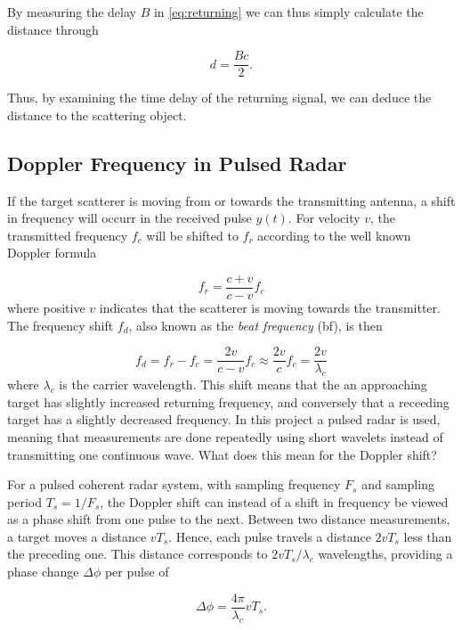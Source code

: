 By measuring the delay $B$ in \eqref{eq:returning} we can thus simply calculate the distance through

\begin{equation}
	d = \frac{Bc}{2}.
\end{equation}

Thus, by examining the time delay of the returning signal, we can deduce the distance to the scattering object. 

\subsection{Doppler Frequency in Pulsed Radar}\label{sec:doppler}
\label{doppler}

If the target scatterer is moving from or towards the transmitting antenna, a shift in frequency will occurr in the received pulse $y(t)$. For velocity $v$, the transmitted frequency $f_c$ will be shifted to $f_r$ according to the well known Doppler formula \citep{ridenour_1947}

\begin{equation}
	f_r = \frac{c + v}{c - v}f_c
\end{equation}
where positive $v$ indicates that the scatterer is moving towards the transmitter. The frequency shift $f_d$, also known as the \emph{beat frequency} (\gls{bf}), is then

\begin{equation}\label{eq:dshift}
	f_d 
	= f_r - f_c 
	= \frac{2v}{c-v}f_c \approx \frac{2v}{c}f_c 
	= \frac{2v}{\lambda_c}
\end{equation}
where $\lambda_c$ is the carrier wavelength. This shift means that the an approaching target has slightly increased returning frequency, and conversely that a receeding target has a slightly decreased frequency. In this project a pulsed radar is used, meaning that measurements are done repeatedly using short wavelets instead of transmitting one continuous wave. What does this mean for the Doppler shift?

For a pulsed coherent radar system, with sampling frequency $F_s$ and sampling period $T_s = 1/F_s$, the Doppler shift can instead of a shift in frequency be viewed as a phase shift from one pulse to the next. Between two distance measurements, a target moves a distance $vT_s$. Hence, each pulse travels a distance $2vT_s$ less than the preceding one. This distance corresponds to $2vT_s/\lambda_c$ wavelengths, providing a phase change $\Delta \phi$ per pulse of

\begin{equation}
	\Delta \phi = \frac{4\pi}{\lambda_c}vT_s.
\end{equation}

